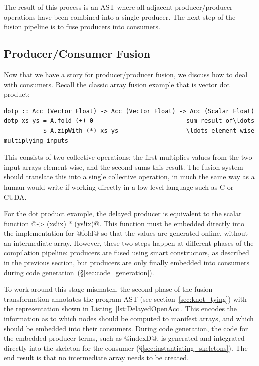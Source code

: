 The result of this process is an AST where all adjacent producer/producer
operations have been combined into a single producer. The next step of the
fusion pipeline is to fuse producers into consumers.


\subsection{Producer/Consumer Fusion}
\label{sec:producer_consumer_fusion}

Now that we have a story for producer/producer fusion, we discuss how to deal
with consumers. Recall the classic array fusion example that is vector dot
product:

\begin{lstlisting}[style=haskell]
dotp :: Acc (Vector Float) -> Acc (Vector Float) -> Acc (Scalar Float)
dotp xs ys = A.fold (+) 0                       -- sum result of\ldots
           $ A.zipWith (*) xs ys                -- \ldots element-wise multiplying inputs
\end{lstlisting}
%
This consists of two collective operations: the first multiplies values from the
two input arrays element-wise, and the second sums this result. The fusion
system should translate this into a single collective operation, in much the
same way as a human would write if working directly in a low-level language such
as C or CUDA\@.

For the dot product example, the delayed producer is equivalent to the scalar
function @\ix -> (xs!ix) * (ys!ix)@. This function must be embedded directly
into the implementation for @fold@ so that the values are generated online,
without an intermediate array. However, these two steps happen at different
phases of the compilation pipeline: producers are fused using smart
constructors, as described in the previous section, but producers are only
finally embedded into consumers during code
generation~(\S\ref{sec:code_generation}).

To work around this stage mismatch, the second phase of the fusion
transformation annotates the program AST (see section~\ref{sec:knot_tying}) with
the representation shown in Listing~\ref{lst:DelayedOpenAcc}. This encodes the
information as to which nodes should be computed to manifest arrays, and which
should be embedded into their consumers. During code generation, the code for
the embedded producer terms, such as @indexD@, is generated and integrated
directly into the skeleton for the consumer
(\S\ref{sec:instantiating_skeletons}). The end result is that no intermediate
array needs to be created.

